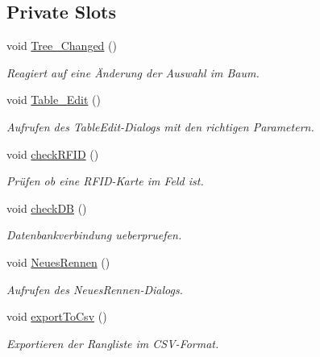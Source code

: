 \subsection*{Private Slots}
\begin{CompactItemize}
\item 
void \hyperlink{class_b_e_o___timing_e6ea4891e62ef27156bba2ddec60683a}{Tree\_\-Changed} ()
\begin{CompactList}\small\item\em Reagiert auf eine Änderung der Auswahl im Baum. \item\end{CompactList}\item 
void \hyperlink{class_b_e_o___timing_c854db88175caa8572dd15831b4bfb18}{Table\_\-Edit} ()
\begin{CompactList}\small\item\em Aufrufen des TableEdit-Dialogs mit den richtigen Parametern. \item\end{CompactList}\item 
void \hyperlink{class_b_e_o___timing_b3d37415fce4b586bca4397bd790105c}{checkRFID} ()
\begin{CompactList}\small\item\em Prüfen ob eine RFID-Karte im Feld ist. \item\end{CompactList}\item 
void \hyperlink{class_b_e_o___timing_6695ca0572c0a4484d2926c16a3f477b}{checkDB} ()
\begin{CompactList}\small\item\em Datenbankverbindung ueberpruefen. \item\end{CompactList}\item 
void \hyperlink{class_b_e_o___timing_6836bffd46ffdbf81149f4e245435731}{NeuesRennen} ()
\begin{CompactList}\small\item\em Aufrufen des NeuesRennen-Dialogs. \item\end{CompactList}\item 
void \hyperlink{class_b_e_o___timing_c04ab99954514a018e78de4b0224cdb5}{exportToCsv} ()
\begin{CompactList}\small\item\em Exportieren der Rangliste im CSV-Format. \item\end{CompactList}\item 

\end{CompactItemize}
